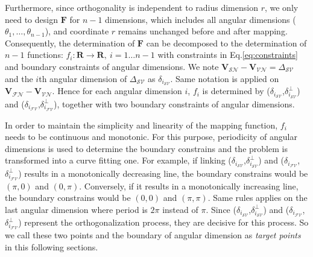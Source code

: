 Furthermore, since orthogonality is independent to radius dimension $r$, we only need to design $\mathbf{F}$ for $n-1$ dimensions, which includes all angular dimensions ($\theta_1,\dots,\theta_{n-1}$), and coordinate $r$ remains unchanged before and after mapping. Consequently, the determination of $\mathbf{F}$ can be decomposed to the determination of $n-1$ functions: $f_i: \mathbf{R}\to \mathbf{R},~i=1\dots n-1$ with constraints in Eq.\ref{eq:constraints} and boundary constraints of angular dimensions. %
We note $\mathbf{V}_{\mathcal{SN}} - \mathbf{V}_{\mathcal{VN}} = \Delta_{\mathcal{SV}}$ and the $i$th angular dimension of $\Delta_{\mathcal{SV}}$ as $\delta_{i_{{\mathcal{SV}}}}$. Same notation is applied on $\mathbf{V}_{\mathcal{FN}} - \mathbf{V}_{\mathcal{VN}}$. %
Hence for each angular dimension $i$, $f_i$ is determined by ($\delta_{i_{{\mathcal{SV}}}}$,$\delta^{\perp}_{i_{{\mathcal{SV}}}}$) and ($\delta_{i_{{\mathcal{FV}}}}$,$\delta^{\perp}_{i_{{\mathcal{FV}}}}$), together with two boundary constraints of angular dimensions.

In order to maintain the simplicity and linearity of the mapping function, $f_i$ needs to be continuous and monotonic. For this purpose, periodicity of angular dimensions is used to determine the boundary constrains and the problem is transformed into a curve fitting one. For example, if linking ($\delta_{i_{{\mathcal{SV}}}}$,$\delta^{\perp}_{i_{{\mathcal{SV}}}}$) and ($\delta_{i_{{\mathcal{FV}}}}$,$\delta^{\perp}_{i_{{\mathcal{FV}}}}$) results in a monotonically decreasing line, the boundary constrains would be $(\pi,0)$ and $(0,\pi)$. Conversely, if it results in a monotonically increasing line, the boundary constrains would be $(0,0)$ and $(\pi,\pi)$. Same rules applies on the last angular dimension where period is $2\pi$ instead of $\pi$. Since  ($\delta_{i_{{\mathcal{SV}}}}$,$\delta^{\perp}_{i_{{\mathcal{SV}}}}$) and ($\delta_{i_{{\mathcal{FV}}}}$,$\delta^{\perp}_{i_{{\mathcal{FV}}}}$) represent the orthogonalization process, they are decisive for this process. So we call these two points and the boundary of angular dimension as \textit{target points} in this following sections.

